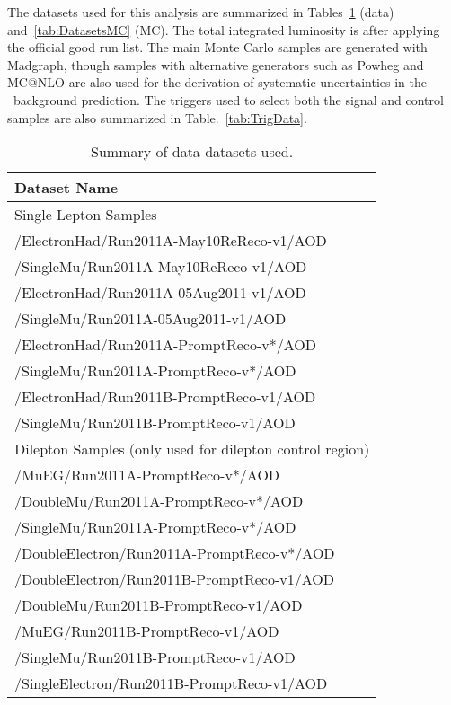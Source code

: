 
The datasets used for this analysis are summarized in 
Tables~\ref{tab:DatasetsData} (data) and~\ref{tab:DatasetsMC} (MC).
The total integrated luminosity is \lumi after
applying the official good run list. The main Monte Carlo
samples are generated with Madgraph, though samples with
alternative generators such as Powheg and MC@NLO are also used for
the derivation of systematic uncertainties in the \ttbar~background prediction. 
The triggers used to select both the signal and control samples are
also summarized in Table.~\ref{tab:TrigData}.

\begin{table}[!ht]
\begin{center}
\begin{tabular}{l}
\hline
Dataset Name   \\
\hline
\hline
Single Lepton Samples \\
\hline
/ElectronHad/Run2011A-May10ReReco-v1/AOD \\
/SingleMu/Run2011A-May10ReReco-v1/AOD \\
/ElectronHad/Run2011A-05Aug2011-v1/AOD \\
/SingleMu/Run2011A-05Aug2011-v1/AOD \\
/ElectronHad/Run2011A-PromptReco-v*/AOD \\
/SingleMu/Run2011A-PromptReco-v*/AOD \\
/ElectronHad/Run2011B-PromptReco-v1/AOD \\
/SingleMu/Run2011B-PromptReco-v1/AOD \\
\hline
\hline
Dilepton Samples (only used for dilepton control region)\\
\hline
/MuEG/Run2011A-PromptReco-v*/AOD   \\
/DoubleMu/Run2011A-PromptReco-v*/AOD   \\
/SingleMu/Run2011A-PromptReco-v*/AOD   \\
/DoubleElectron/Run2011A-PromptReco-v*/AOD   \\
/DoubleElectron/Run2011B-PromptReco-v1/AOD   \\
/DoubleMu/Run2011B-PromptReco-v1/AOD   \\
/MuEG/Run2011B-PromptReco-v1/AOD   \\
/SingleMu/Run2011B-PromptReco-v1/AOD   \\
/SingleElectron/Run2011B-PromptReco-v1/AOD   \\
\hline
\end{tabular}
\caption{Summary of data datasets used.\label{tab:DatasetsData}}
\end{center}
\end{table}

